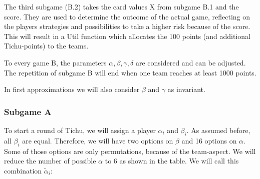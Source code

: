 The third subgame (B.2) takes the card values X from subgame B.1 and the score. They are used to determine the outcome of the actual game, reflecting on the players strategies and possibilities to take a higher risk because of the score. This will result in a Util function which allocates the 100 points (and additional Tichu-points) to the teams. 

To every game B, the parameters $\alpha, \beta, \gamma, \delta$ are considered and can be adjusted.  
The repetition of subgame B will end when one team reaches at least 1000 points. 

In first approximations we will also consider $\beta$ and $\gamma$ as invariant. 

\subsubsection{Subgame A}
To start a round of Tichu, we will assign a player $\alpha_i$ and $\beta_i$. As assumed before, all $\beta_i$ are equal. Therefore, we will have two options on $\beta$ and 16 options on $\alpha$. Some of those options are only permutations, because of the team-aspect. We will reduce the number of possible $\alpha$ to 6 as shown in the table. We will call this combination $\tilde{\alpha}_i$: \\
\begin{table}[h]
\end{table}
\begin{table}[h]
\end{table}
